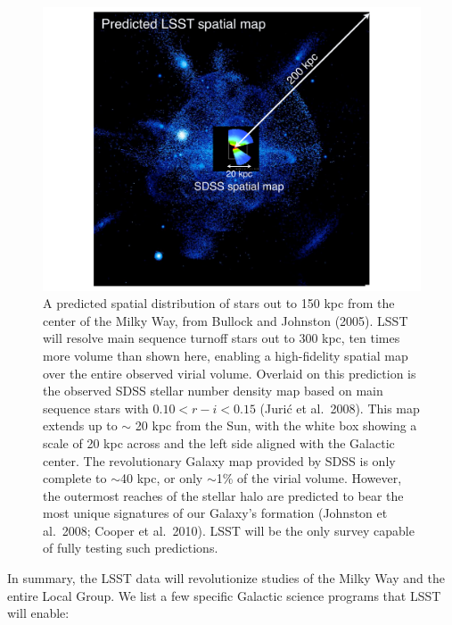 \documentclass{emulateapj}
\begin{document}
\begin{figure}
\hskip -0.5in
\includegraphics[width=1.3\hsize,clip]{BethMWhalo.pdf}
\caption{A predicted spatial distribution of stars out to 150 kpc from the center of the Milky Way, 
from Bullock and Johnston (2005).  LSST will resolve main sequence turnoff stars out to 300 kpc, ten times 
more volume than shown here, enabling a high-fidelity spatial map over the entire observed virial volume.  
Overlaid on this prediction is the observed SDSS stellar number density map based on main sequence stars 
with $0.10 < r-i < 0.15$ (Juri\'{c} et al.~2008).  This map extends up to $\sim$ 20 kpc from the Sun, with 
the white box showing a scale of 20 kpc across and the left side aligned with the Galactic center.  
The revolutionary Galaxy map provided by SDSS is only complete to $\sim$40 kpc, or only $\sim$1\% of
the virial volume.  However, the outermost reaches of the stellar halo are predicted to bear the most unique 
signatures of our Galaxy's formation (Johnston et al.~2008;  Cooper et al.~2010).   LSST will be the only survey 
capable of fully testing such predictions.}
\label{Fig:halo}
\end{figure}

 

In summary, the LSST data will revolutionize studies of the Milky Way and the entire Local Group. We list a few specific 
Galactic science programs that LSST will enable:
\end{document}
